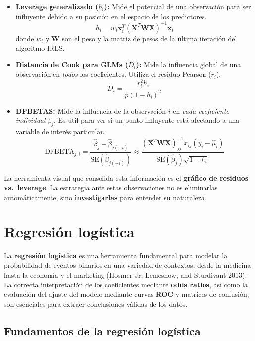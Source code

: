 \documentclass[
  letterpaper,
  DIV=11,
  numbers=noendperiod]{scrreprt}
\begin{document}
\begin{itemize}
\item
  \textbf{Leverage generalizado (\(h_i\)):} Mide el potencial de una
  observación para ser influyente debido a su posición en el espacio de
  los predictores. \[
    h_i = w_i \mathbf{x}_i^T (\mathbf{X}^T \mathbf{W} \mathbf{X})^{-1} \mathbf{x}_i
    \] donde \(w_i\) y \(\mathbf{W}\) son el peso y la matriz de pesos
  de la última iteración del algoritmo IRLS.
\item
  \textbf{Distancia de Cook para GLMs (\(D_i\)):} Mide la influencia
  global de una observación en \emph{todos} los coeficientes. Utiliza el
  residuo Pearson (\(r_i\)). \[
    D_i = \frac{r_i^2 h_i}{p(1-h_i)^2}
    \]
\item
  \textbf{DFBETAS:} Mide la influencia de la observación \(i\) en
  \emph{cada coeficiente individual} \(\beta_j\). Es útil para ver si un
  punto influyente está afectando a una variable de interés particular.
  \[
    \text{DFBETA}_{j,i} = \frac{\hat{\beta}_j - \hat{\beta}_{j(-i)}}{\text{SE}(\hat{\beta}_{j(-i)})} \approx \frac{(\mathbf{X}^T\mathbf{W}\mathbf{X})^{-1}_{jj}x_{ij}(y_i-\hat{\mu}_i)}{\text{SE}(\hat{\beta}_j)\sqrt{1-h_i}}
    \]
\end{itemize}

La herramienta visual que consolida esta información es el
\textbf{gráfico de residuos vs.~leverage}. La estrategia ante estas
observaciones no es eliminarlas automáticamente, sino
\textbf{investigarlas} para entender su naturaleza.

\section{Regresión logística}\label{regresiuxf3n-loguxedstica}

La \textbf{regresión logística} es una herramienta fundamental para
modelar la probabilidad de eventos binarios en una variedad de
contextos, desde la medicina hasta la economía y el marketing (Hosmer
Jr, Lemeshow, and Sturdivant 2013). La correcta interpretación de los
coeficientes mediante \textbf{odds ratios}, así como la evaluación del
ajuste del modelo mediante curvas \textbf{ROC} y matrices de confusión,
son esenciales para extraer conclusiones válidas de los datos.

\subsection{Fundamentos de la regresión
logística}\label{fundamentos-de-la-regresiuxf3n-loguxedstica}
\end{document}
